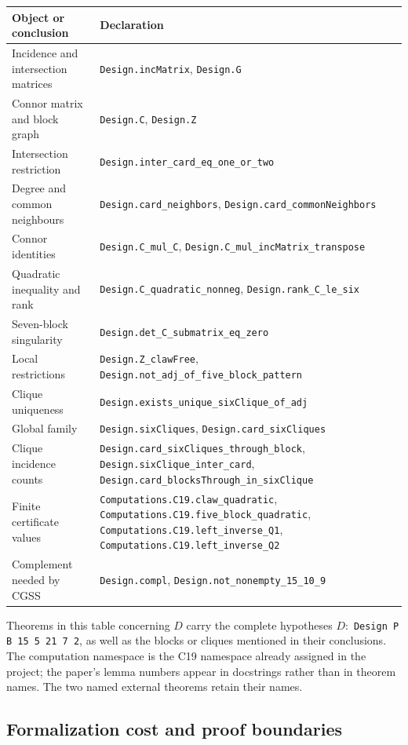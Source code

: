 \documentclass[11pt]{article}
\theoremstyle{definition}
\newcommand{\code}[1]{{\small\nolinkurl{#1}}}
\begin{document}
\begin{center}
\begin{tabular}{L{.32\textwidth}L{.58\textwidth}}
\toprule
Object or conclusion & Declaration\\
\midrule
Incidence and intersection matrices &
\code{Design.incMatrix}, \code{Design.G}\\
Connor matrix and block graph &
\code{Design.C}, \code{Design.Z}\\
Intersection restriction &
\code{Design.inter_card_eq_one_or_two}\\
Degree and common neighbours &
\code{Design.card_neighbors}, \code{Design.card_commonNeighbors}\\
Connor identities &
\code{Design.C_mul_C}, \code{Design.C_mul_incMatrix_transpose}\\
Quadratic inequality and rank &
\code{Design.C_quadratic_nonneg}, \code{Design.rank_C_le_six}\\
Seven-block singularity &
\code{Design.det_C_submatrix_eq_zero}\\
Local restrictions &
\code{Design.Z_clawFree}, \code{Design.not_adj_of_five_block_pattern}\\
Clique uniqueness &
\code{Design.exists_unique_sixClique_of_adj}\\
Global family &
\code{Design.sixCliques}, \code{Design.card_sixCliques}\\
Clique incidence counts &
\code{Design.card_sixCliques_through_block},
\code{Design.sixClique_inter_card},
\code{Design.card_blocksThrough_in_sixClique}\\
Finite certificate values &
\code{Computations.C19.claw_quadratic},
\code{Computations.C19.five_block_quadratic},
\code{Computations.C19.left_inverse_Q1},
\code{Computations.C19.left_inverse_Q2}\\
Complement needed by CGSS &
\code{Design.compl}, \code{Design.not_nonempty_15_10_9}\\
\bottomrule
\end{tabular}
\end{center}

Theorems in this table concerning $D$ carry the complete hypotheses
$D:$ \code{Design P B 15 5 21 7 2}, as well as the
blocks or cliques mentioned in their conclusions. The computation
namespace is the C19 namespace already assigned in the project;
the paper's lemma numbers appear in docstrings rather than in
theorem names. The two named external theorems retain their names.

\subsection*{Formalization cost and proof boundaries}
\end{document}
